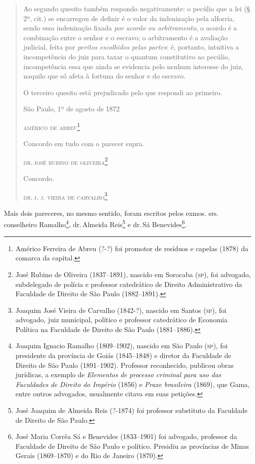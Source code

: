 \begin{quote}
Ao segundo quesito também respondo negativamente: o pecúlio que a lei (§
2º, cit.) se encarregou de definir é o valor da indenização pela
alforria, sendo essa indenização fixada \emph{por acordo ou
arbitramento}, o acordo é a combinação entre o senhor e o escravo; o
arbitramento é a avaliação judicial, feita por \emph{peritos escolhidos
pelas partes}: é, portanto, intuitiva a incompetência do juiz para taxar
o quantum constitutivo ao pecúlio, incompetência essa que ainda se
evidencia pelo nenhum interesse do juiz, naquilo que só afeta à fortuna
do senhor e do escravo.

O terceiro quesito está prejudicado pelo que respondi ao primeiro.

\begin{flushright}
São Paulo, 1º de agosto de 1872

\textsc{américo de abreu}\footnote{ Américo Ferreira de Abreu (?-?) foi promotor
  de resíduos e capelas (1878) da comarca da capital.}
\end{flushright}

Concordo em tudo com o parecer supra.

\begin{flushright}
\textsc{dr.\,josé rubino de oliveira}\footnote{ José Rubino de Oliveira
  (1837--1891), nascido em Sorocaba (\textsc{sp}), foi advogado, subdelegado de
  polícia e professor catedrático de Direito Administrativo da Faculdade
  de Direito de São Paulo (1882--1891).}
\end{flushright}

Concordo.

\begin{flushright}
\textsc{dr.\,j. j. vieira de carvalho}\footnote{ Joaquim José Vieira de Carvalho
  (1842-?), nascido em Santos (\textsc{sp}), foi advogado, juiz municipal,
  político e professor catedrático de Economia Política na Faculdade de
  Direito de São Paulo (1881--1886).}
\end{flushright}
\end{quote}

Mais dois pareceres, no mesmo sentido, foram escritos pelos exmos. srs.
conselheiro Ramalho\footnote{ Joaquim Ignacio Ramalho (1809--1902),
  nascido em São Paulo (\textsc{sp}), foi presidente da província de Goiás
  (1845--1848) e diretor da Faculdade de Direito de São Paulo
  (1891--1902). Professor reconhecido, publicou obras jurídicas, a
  exemplo de \emph{Elementos de processo criminal para uso das
  Faculdades de Direito do Império} (1856) e \emph{Praxe brasileira}
  (1869), que Gama, entre outros advogados, usualmente citava em suas
  petições.}, dr.\,Almeida Reis\footnote{ José Joaquim de Almeida Reis
  (?-1874) foi professor substituto da Faculdade de Direito de São
  Paulo.} e dr.\,Sá Benevides\footnote{ José Maria Corrêa Sá e Benevides
  (1833--1901) foi advogado, professor da Faculdade de Direito de São
  Paulo e político. Presidiu as províncias de Minas Gerais (1869--1870) e
  do Rio de Janeiro (1870).}.

